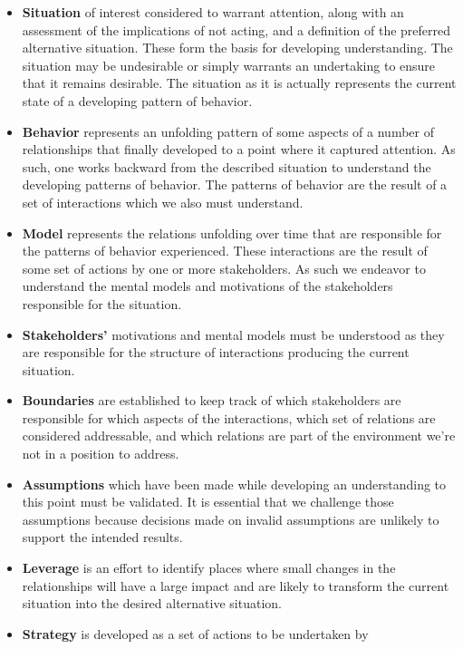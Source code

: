 \documentclass[]{memoir}
\begin{document}
\begin{itemize}
\itemsep1pt\parskip0pt
\item
  \textbf{Situation} of interest considered to warrant attention, along
  with an assessment of the implications of not acting, and a definition
  of the preferred alternative situation. These form the basis for
  developing understanding. The situation may be undesirable or simply
  warrants an undertaking to ensure that it remains desirable. The
  situation as it is actually represents the current state of a
  developing pattern of behavior.
\item
  \textbf{Behavior} represents an unfolding pattern of some aspects of a
  number of relationships that finally developed to a point where it
  captured attention. As such, one works backward from the described
  situation to understand the developing patterns of behavior. The
  patterns of behavior are the result of a set of interactions which we
  also must understand.
\item
  \textbf{Model} represents the relations unfolding over time that are
  responsible for the patterns of behavior experienced. These
  interactions are the result of some set of actions by one or more
  stakeholders. As such we endeavor to understand the mental models and
  motivations of the stakeholders responsible for the situation.
\item
  \textbf{Stakeholders'} motivations and mental models must be
  understood as they are responsible for the structure of interactions
  producing the current situation.
\item
  \textbf{Boundaries} are established to keep track of which
  stakeholders are responsible for which aspects of the interactions,
  which set of relations are considered addressable, and which relations
  are part of the environment we're not in a position to address.
\item
  \textbf{Assumptions} which have been made while developing an
  understanding to this point must be validated. It is essential that we
  challenge those assumptions because decisions made on invalid
  assumptions are unlikely to support the intended results.
\item
  \textbf{Leverage} is an effort to identify places where small changes
  in the relationships will have a large impact and are likely to
  transform the current situation into the desired alternative
  situation.
\item
  \textbf{Strategy} is developed as a set of actions to be undertaken by

\end{itemize}
\end{document}
